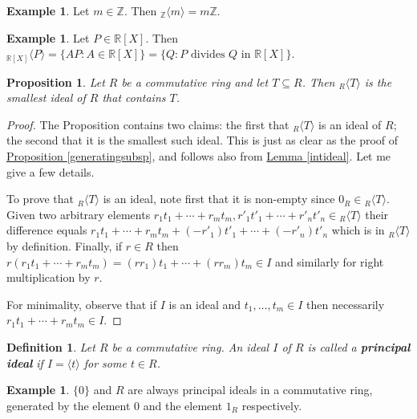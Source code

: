 \documentclass[11pt]{amsbook}
\newtheorem{definition}[theorem]{Definition}
\newtheorem{proposition}[theorem]{Proposition}
\theoremstyle{definition}
\newtheorem{ex}[theorem]{Example}
\begin{document}
\begin{ex} Let $m\in \mathbb{Z}$. Then ${}_\mathbb{Z}\langle m \rangle = m\mathbb{Z}$.
\end{ex}

\begin{ex} Let $P\in \mathbb{R}[X]$. Then ${}_{\mathbb{R}[X]}\langle P \rangle = \{ AP: A\in \mathbb{R}[X]\} = \{ Q:  P \text{ divides } Q \text{ in } \mathbb{R}[X]\}$.
\end{ex}

\begin{proposition}
Let $R$ be a commutative ring and let $T\subseteq R$. Then ${}_R\langle T
\rangle$ is the smallest ideal of $R$ that contains $T$.
\end{proposition}

\begin{proof}
 The Proposition contains two claims: the first that ${}_R\langle T \rangle$ is an ideal of $R$; the second that it is the smallest such ideal. This is just as clear as the proof of \hyperref[generatingsubsp]{Proposition \ref{generatingsubsp}}, and follows also from \hyperref[intideal]{Lemma \ref{intideal}}. Let me give a few details.

To prove that ${}_R\langle T \rangle $ is an ideal, note first that it is non-empty since $0_R\in {}_R\langle T \rangle$. Given two arbitrary elements $r_1t_1 + \cdots +r_mt_m, r'_1t'_1 + \cdots + r'_{n}t'_n \in {}_R\langle T \rangle$ their difference equals $ r_1t_1 + \cdots +r_mt_m + (- r'_1)t'_1 + \cdots +(- r'_{n})t'_n$ which is  in ${}_R\langle T \rangle$ by definition. Finally, if $r\in R$ then $r( r_1t_1 + \cdots + r_mt_m) = (rr_1)t_1 + \cdots + (rr_m)t_m \in I$ and similarly for right multiplication by $r$.

For minimality, observe that if $I$ is an ideal and $t_1, \ldots , t_m \in I$ then necessarily $ r_1t_1 + \cdots + r_mt_m \in I$.
\end{proof}

\begin{definition} \label{prindef}
Let $R$ be a commutative ring. An ideal $I$ of $R$ is called a
\textbf{principal ideal} if $I = \langle t \rangle$ for some
$t\in R$.
\end{definition}

\begin{ex}  $\{0\}$ and $R$ are always principal ideals in a commutative ring, generated by the element $0$ and the element $1_R$ respectively.
\end{ex}
\end{document}
